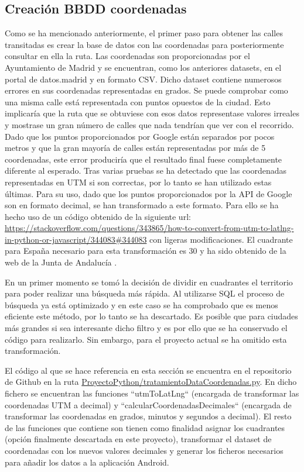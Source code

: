 \subsection{Creación BBDD coordenadas}
Como se ha mencionado anteriormente, el primer paso para obtener las calles transitadas es crear la base de datos con las coordenadas para posteriormente consultar en ella la ruta.
Las coordenadas son proporcionadas por el Ayuntamiento de Madrid y se encuentran, como los anteriores datasets, en el portal de datos.madrid y en formato CSV.
Dicho dataset contiene numerosos errores en sus coordenadas representadas en grados. Se puede comprobar como una misma calle está representada con puntos opuestos de la ciudad. Esto implicaría que la ruta que se obtuviese con esos datos representase valores irreales y mostrase un gran número de calles que nada tendrían que ver con el recorrido. Dado que los puntos proporcionados por Google están separados por pocos metros y que la gran mayoría de calles están representadas por más de 5 coordenadas, este error produciría que el resultado final fuese completamente diferente al esperado.
Tras varias pruebas se ha detectado que las coordenadas representadas en UTM si son correctas, por lo tanto se han utilizado estas últimas. Para su uso, dado que los puntos proporcionados por la API de Google son en formato decimal, se han transformado a este formato. Para ello se ha hecho uso de un código obtenido de la siguiente url: \url{https://stackoverflow.com/questions/343865/how-to-convert-from-utm-to-latlng-in-python-or-javascript/344083#344083} con ligeras modificaciones. El cuadrante para España necesario para esta transformación es 30 y ha sido obtenido de la web de la Junta de Andalucía \cite{UTM_cuadrante_andalucia}.

En un primer momento se tomó la decisión de dividir en cuadrantes el territorio para poder realizar una búsqueda más rápida. Al utilizarse SQL el proceso de búsqueda ya está optimizado y en este caso se ha comprobado que es menos eficiente este método, por lo tanto se ha descartado. Es posible que para ciudades más grandes si sea interesante dicho filtro y es por ello que se ha conservado el código para realizarlo. Sin embargo, para el proyecto actual se ha omitido esta transformación.

El código al que se hace referencia en esta sección se encuentra en el repositorio de Github 	\cite{githubRepositorio} en la ruta \url{ProyectoPython/tratamientoDataCoordenadas.py}.
En dicho fichero se encuentran las funciones ``utmToLatLng`` (encargada de transformar las coordenadas UTM  a decimal) y ``calcularCoordenadasDecimales`` (encargada de transformar las coordenadas en grados, minutos y segundos a decimal). El resto de las funciones que contiene son tienen como finalidad asignar los cuadrantes (opción finalmente descartada en este proyecto), transformar el dataset de coordenadas con los nuevos valores decimales y generar los ficheros necesarios para añadir los datos a la aplicación Android.

